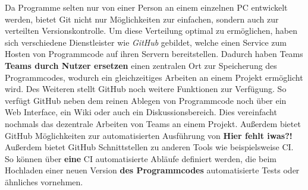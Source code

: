 Da Programme selten nur von einer Person an einem einzelnen PC entwickelt
werden, bietet Git nicht nur Möglichkeiten zur einfachen, sondern auch zur
verteilten Versionskontrolle. Um diese Verteilung optimal zu ermöglichen, haben
sich verschiedene Dienstleister wie \textit{GitHub} gebildet, welche einen
Service zum Hosten von Programmcode auf ihren Servern bereitstellen. Dadurch
haben Teams \textbf{Teams durch Nutzer ersetzen} einen zentralen Ort zur Speicherung des Programmcodes,
wodurch ein gleichzeitiges Arbeiten an einem Projekt ermöglicht wird. Des
Weiteren stellt GitHub noch weitere Funktionen zur Verfügung. So verfügt GitHub
neben dem reinen Ablegen von Programmcode noch über ein Web Interface, ein Wiki
oder auch ein Diskussionsbereich. Dies vereinfacht nochmals das dezentrale
Arbeiten von Teams an einem Projekt. Außerdem bietet GitHub Möglichkeiten zur
automatisierten Ausführung von \textbf{Hier fehlt iwas?!} Außerdem bietet GitHub Schnittstellen zu anderen
Tools wie beispielsweise \ac{CI}. So können über \textbf{eine} \ac{CI} automatisierte Abläufe
definiert werden, die beim Hochladen einer neuen Version \textbf{des Programmcodes} automatisierte Tests
oder ähnliches vornehmen.  \autocite{bell_2014}

